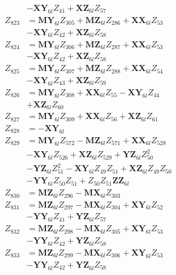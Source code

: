 \begin{multicols}{2}
\begin{align}
&- \mathbf{XY}_{6l}Z_{41} + \mathbf{XZ}_{6l}Z_{57} \nonumber \\
Z_{823} &= \mathbf{MY}_{6l}Z_{305} + \mathbf{MZ}_{6l}Z_{286} + \mathbf{XX}_{6l}Z_{53}  \nonumber \\
&- \mathbf{XY}_{6l}Z_{42} + \mathbf{XZ}_{6l}Z_{58} \nonumber \\
Z_{824} &= \mathbf{MY}_{6l}Z_{306} + \mathbf{MZ}_{6l}Z_{287} + \mathbf{XX}_{6l}Z_{53}  \nonumber \\
&- \mathbf{XY}_{6l}Z_{42} + \mathbf{XZ}_{6l}Z_{58} \nonumber \\
Z_{825} &= \mathbf{MY}_{6l}Z_{307} + \mathbf{MZ}_{6l}Z_{288} + \mathbf{XX}_{6l}Z_{54}  \nonumber \\
&- \mathbf{XY}_{6l}Z_{43} + \mathbf{XZ}_{6l}Z_{59} \nonumber \\
Z_{826} &= \mathbf{MY}_{6l}Z_{308} + \mathbf{XX}_{6l}Z_{55} - \mathbf{XY}_{6l}Z_{44}  \nonumber \\
&+ \mathbf{XZ}_{6l}Z_{60} \nonumber \\
Z_{827} &= \mathbf{MY}_{6l}Z_{309} + \mathbf{XX}_{6l}Z_{56} + \mathbf{XZ}_{6l}Z_{61} \nonumber \\
Z_{828} &= -\mathbf{XY}_{6l} \nonumber \\
Z_{829} &= \mathbf{MY}_{6l}Z_{572} - \mathbf{MZ}_{6l}Z_{571} + \mathbf{XX}_{6l}Z_{528}  \nonumber \\
&- \mathbf{XY}_{6l}Z_{526} + \mathbf{XZ}_{6l}Z_{529} + \mathbf{YZ}_{6l}Z_{50}^2  \nonumber \\
&- \mathbf{YZ}_{6l}Z_{51}^2 - \mathbf{XY}_{6l}Z_{49}Z_{51} + \mathbf{XZ}_{6l}Z_{49}Z_{50}  \nonumber \\
&- \mathbf{YY}_{6l}Z_{50}Z_{51} + Z_{50}Z_{51}\mathbf{ZZ}_{6l} \nonumber \\
Z_{830} &= \mathbf{MZ}_{6l}Z_{296} - \mathbf{MX}_{6l}Z_{303} \nonumber \\
Z_{831} &= \mathbf{MZ}_{6l}Z_{297} - \mathbf{MX}_{6l}Z_{304} + \mathbf{XY}_{6l}Z_{52}  \nonumber \\
&- \mathbf{YY}_{6l}Z_{41} + \mathbf{YZ}_{6l}Z_{57} \nonumber \\
Z_{832} &= \mathbf{MZ}_{6l}Z_{298} - \mathbf{MX}_{6l}Z_{305} + \mathbf{XY}_{6l}Z_{53}  \nonumber \\
&- \mathbf{YY}_{6l}Z_{42} + \mathbf{YZ}_{6l}Z_{58} \nonumber \\
Z_{833} &= \mathbf{MZ}_{6l}Z_{299} - \mathbf{MX}_{6l}Z_{306} + \mathbf{XY}_{6l}Z_{53}  \nonumber \\
&- \mathbf{YY}_{6l}Z_{42} + \mathbf{YZ}_{6l}Z_{58} \nonumber \\

\end{align}
\end{multicols}
